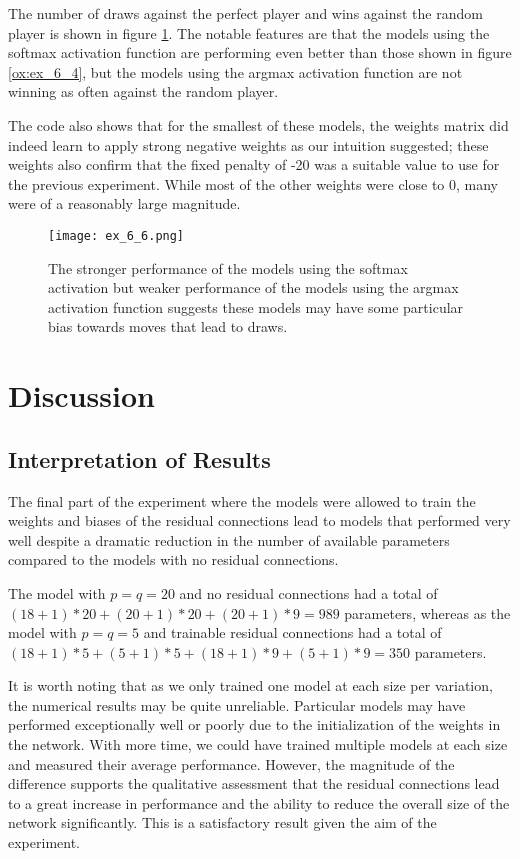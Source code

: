 \documentclass{somasmsc}
\begin{document}
\begin{exa}
The number of draws against the perfect player and wins against the random player is shown in figure \ref{ox:ex_6_6}. The notable features are that the models using the softmax activation function are performing even better than those shown in figure \ref{ox:ex_6_4}, but the models using the argmax activation function are not winning as often against the random player.

The code also shows that for the smallest of these models, the weights matrix did indeed learn to apply strong negative weights as our intuition suggested; these weights also confirm that the fixed penalty of -20 was a suitable value to use for the previous experiment. While most of the other weights were close to 0, many were of a reasonably large magnitude.

\begin{figure}[H]\label{ox:ex_6_6}
\begin{center}
\texttt{[image: ex\_6\_6.png]}
\end{center}
\caption{The stronger performance of the models using the softmax activation but weaker performance of the models using the argmax activation function suggests these models may have some particular bias towards moves that lead to draws.}
\end{figure}
\end{exa}

\section{Discussion}

\subsection{Interpretation of Results}

The final part of the experiment where the models were allowed to train the weights and biases of the residual connections lead to models that performed very well despite a dramatic reduction in the number of available parameters compared to the models with no residual connections.

The model with $p=q=20$ and no residual connections had a total of $\left(18+1\right)*20+\left(20+1\right)*20+\left(20+1\right)*9=989$ parameters, whereas as the model with $p=q=5$ and trainable residual connections had a total of $\left(18+1\right)*5+\left(5+1\right)*5+\left(18+1\right)*9+\left(5+1\right)*9=350$ parameters.

It is worth noting that as we only trained one model at each size per variation, the numerical results may be quite unreliable. Particular models may have performed exceptionally well or poorly due to the initialization of the weights in the network. With more time, we could have trained multiple models at each size and measured their average performance. However, the magnitude of the difference supports the qualitative assessment that the residual connections lead to a great increase in performance and the ability to reduce the overall size of the network significantly. This is a satisfactory result given the aim of the experiment.
\end{document}
